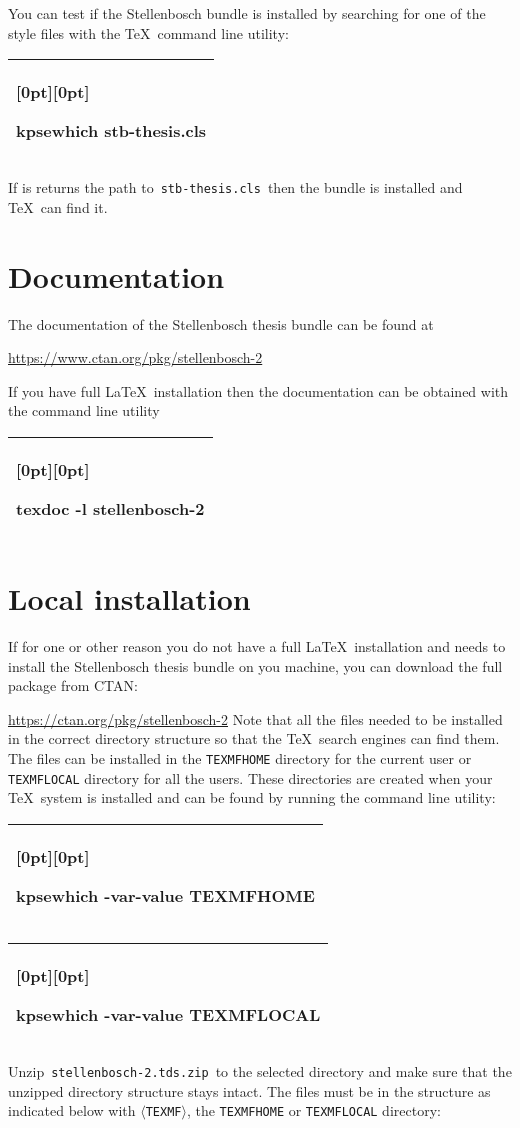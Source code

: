 \documentclass[10pt,a4paper]{article}
\makeatletter
\newenvironment{Cpara}[1][\normalsize]
    {\list{}{\setlength{\leftmargin}{0pt}%
             \setlength{\labelwidth}{0pt}%
             \setlength{\labelsep}{0pt}}%
     \item\relax\cminipage\small#1\ignorespaces}%
    {\endcminipage\endlist}
\newlength\mylena
\newlength\mylenb
\newcommand\mystrut[1][4pt]{%
    \setlength\mylena{\totalheightof{\@arstrutbox}+#1*2}%
    \setlength\mylenb{\depthof{\@arstrutbox}+#1}%
    \rule[-\mylenb]{0pt}{\mylena}}
\newlength{\mytab}
\newcommand{\tab}{\hspace*{\mytab}}
\newcommand\ctab{\makebox[\mytab][l]{\quad\texttt{\textgreater}}}
\newenvironment{CMDline}[1][\normalsize]
    {\list{}{\setlength{\leftmargin}{0pt}%
             \setlength{\labelwidth}{0pt}%
             \setlength{\labelsep}{0pt}}%
     \item\relax%
          \begin{tabular}{@{}p{\linewidth}@{}}
               \hline\rowcolor{stbMaroon}[0pt][0pt]
               \mystrut\color{white}\small\ctab\ttfamily#1\ignorespaces}%
    {\\\hline\end{tabular}\endlist}
\newcommand*\file[1]{\,\texttt{#1}\,}%
\makeatother
\begin{document}
\noindent You can test if the Stellenbosch bundle is installed by searching
for one of the style files with the \TeX\ command line utility:
\begin{CMDline}
     kpsewhich stb-thesis.cls
\end{CMDline}
If is returns the path to \file{stb-thesis.cls} then the bundle is installed
and \TeX\ can find it.


\section*{Documentation}

The documentation of the Stellenbosch thesis bundle can be found at
\begin{Cpara}
    \tab\url{https://www.ctan.org/pkg/stellenbosch-2}
\end{Cpara}
\medskip

\noindent If you have full \LaTeX\ installation then the documentation can be
obtained with the command line utility
\begin{CMDline}
    texdoc -l stellenbosch-2
\end{CMDline}


\section*{Local installation}

If for one or other reason you do not have a full \LaTeX\ installation and
needs to install the Stellenbosch thesis bundle on you machine, you can
download the full package from CTAN:
\begin{Cpara}
    \tab\url{https://ctan.org/pkg/stellenbosch-2}
\end{Cpara}
Note that all the files needed to be installed in the correct directory
structure so that the \TeX\ search engines can find them. The files can be
installed in the \texttt{TEXMFHOME} directory for the current user or
\texttt{TEXMFLOCAL} directory for all the users. These directories are
created when your \TeX\ system is installed and can be found by running the
command line utility:
\begin{CMDline}
    kpsewhich -var-value TEXMFHOME
\end{CMDline}
\begin{CMDline}
    kpsewhich -var-value TEXMFLOCAL
\end{CMDline}

\noindent Unzip \file{stellenbosch-2.tds.zip} to the selected directory and
make sure that the unzipped directory structure stays intact. The files must
be in the structure as indicated below with \texttt{$\langle$TEXMF$\rangle$}, the \texttt{TEXMFHOME} or \texttt{TEXMFLOCAL} directory:
\end{document}
